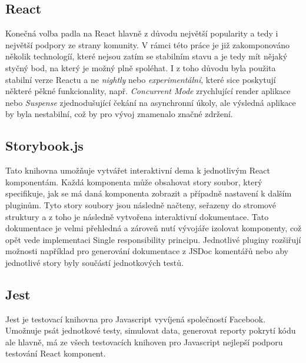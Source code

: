 \subsection{React}
\label{ss:react}
Konečná volba padla na React hlavně z důvodu největší popularity a tedy i největší podpory ze strany komunity. V rámci této práce je již zakomponováno několik technologíí, které nejsou zatím se stabilním stavu a je tedy mít nějaký styčný bod, na který je možný plně spoléhat. I z toho důvodu byla použita stabilní verze Reactu a ne \emph{nightly} nebo \emph{experimentální}, které sice poskytují některé pěkné funkcionality, např. \emph{Concurrent Mode} zrychlující render aplikace nebo \emph{Suspense} zjednodušující čekání na asynchronní úkoly, ale výsledná aplikace by byla nestabilní, což by pro vývoj znamenalo značné zdržení.


\subsection{Storybook.js}
\label{ss:storybook}
Tato knihovna umožňuje vytvářet interaktivní dema k jednotlivým React komponentám. Každá komponenta může obsahovat story soubor, který specifikuje, jak se má daná komponenta zobrazit a případně nastavení k dalším pluginům. Tyto story soubory jsou následně načteny, seřazeny do stromové struktury a z toho je následně vytvořena interaktivní dokumentace. Tato dokumentace je velmi přehledná a zároveň nutí vývojáře izolovat komponenty, což opět vede implementaci Single responsibility principu. Jednotlivé pluginy rozšiřují možnosti například pro generování dokumentace z JSDoc komentářů nebo aby jednotlivé story byly součástí jednotkových testů.

\subsection{Jest}
\label{ss:jest}
Jest je testovací knihovna pro Javascript vyvíjená společností Facebook. Umožnuje psát jednotkové testy, simulovat data, generovat reporty pokrytí kódu ale hlavně, má ze všech testovacích knihoven pro Javascript nejlepší podporu testování React komponent.

